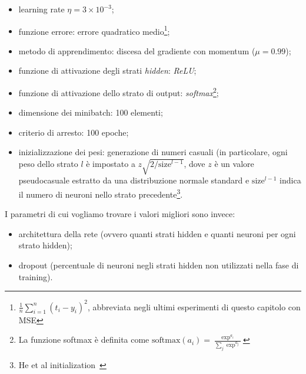 \documentclass[11pt,a4paper,twoside,
openright]{book}
\begin{document}
\begin{itemize}
\item learning rate $\eta=3\times 10^{-3}$;
\item funzione errore: errore quadratico medio\footnote{$\frac{1}{n}\sum\limits^n_{i=1}{\left(t_i-y_i\right)}^2$, abbreviata negli ultimi esperimenti di questo capitolo con MSE};
\item metodo di apprendimento: discesa del gradiente con momentum ($\mu=0.99$);
\item funzione di attivazione degli strati \textit{hidden}: \textit{ReLU};
\item funzione di attivazione dello strato di output: \textit{softmax}\footnote{La funzione softmax è definita come $\text{softmax}(a_{i}) = \frac{\exp^{a_i}}{\sum_j \exp^{a_j}}$};
\item dimensione dei minibatch: 100 elementi;
\item criterio di arresto: 100 epoche;
\item inizializzazione dei pesi: generazione di numeri casuali (in particolare, ogni peso dello strato $l$ è impostato a $z \sqrt{2 / \mathrm{size}^{l-1}}$, dove $z$ è un valore pseudocasuale estratto da una distribuzione normale standard e $\mathrm{size}^{l-1}$ indica il numero di neuroni nello strato precedente\footnote{He et al initialization~\cite{he2015delving}}. 

\end{itemize}

I parametri di cui vogliamo trovare i valori migliori sono invece:
\begin{itemize}
\item architettura della rete (ovvero quanti strati hidden e quanti neuroni per ogni strato hidden);
\item dropout (percentuale di neuroni negli strati hidden non utilizzati nella fase di training).
\end{itemize}
\end{document}
